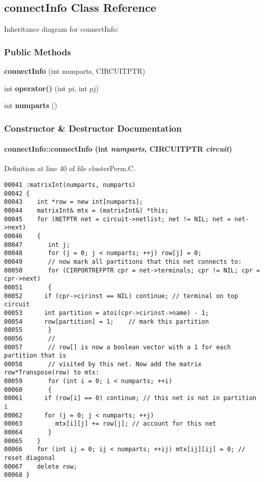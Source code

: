 \subsection{connect\-Info  Class Reference}
\label{connectInfo}
Inheritance diagram for connect\-Info:\begin{figure}[H]
\begin{center}
\leavevmode
\setlength{\epsfysize}{2cm}
\end{center}
\end{figure}
\subsubsection*{Public Methods}
\begin{CompactItemize}
\item 
{\bf connect\-Info} (int numparts, CIRCUITPTR)
\item 
int {\bf operator()} (int pi, int pj)
\item 
int {\bf numparts} ()
\end{CompactItemize}


\subsubsection{Constructor \& Destructor Documentation}
\label{connectInfo_a0}
\paragraph{\setlength{\rightskip}{0pt plus 5cm}connect\-Info::connect\-Info (int {\em numparts}, CIRCUITPTR {\em circuit})}\hfill



Definition at line 40 of file cluster\-Perm.C.\small\begin{verbatim}00041 :matrixInt(numparts, numparts)
00042 {
00043    int *row = new int[numparts];
00044    matrixInt& mtx = (matrixInt&) *this;
00045    for (NETPTR net = circuit->netlist; net != NIL; net = net->next)
00046    {
00047       int j;
00048       for (j = 0; j < numparts; ++j) row[j] = 0;
00049       // now mark all partitions that this net connects to:
00050       for (CIRPORTREFPTR cpr = net->terminals; cpr != NIL; cpr = cpr->next)
00051       {
00052      if (cpr->cirinst == NIL) continue; // terminal on top circuit
00053      int partition = atoi(cpr->cirinst->name) - 1;
00054      row[partition] = 1;    // mark this partition
00055       }
00056       //
00057       // row[] is now a boolean vector with a 1 for each partition that is
00058       // visited by this net. Now add the matrix row*Transpose(row) to mtx:
00059       for (int i = 0; i < numparts; ++i)
00060       {
00061      if (row[i] == 0) continue; // this net is not in partition i
00062      for (j = 0; j < numparts; ++j)
00063         mtx[i][j] += row[j]; // account for this net
00064       }
00065    }
00066    for (int ij = 0; ij < numparts; ++ij) mtx[ij][ij] = 0; // reset diagonal
00067    delete row;
00068 }
\end{verbatim}\normalsize 


